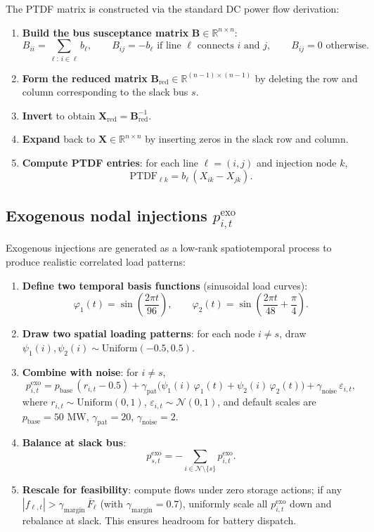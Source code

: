 \documentclass[11pt]{article}
\begin{document}
The PTDF matrix is constructed via the standard DC power flow derivation:
\begin{enumerate}
\item \textbf{Build the bus susceptance matrix} $\mathbf{B}\in\mathbb{R}^{n\times n}$:
\[
B_{ii} = \sum_{\ell:\,i\in\ell} b_\ell, \qquad B_{ij} = -b_\ell \text{ if line } \ell \text{ connects } i \text{ and } j, \qquad B_{ij}=0 \text{ otherwise}.
\]
\item \textbf{Form the reduced matrix} $\mathbf{B}_{\mathrm{red}}\in\mathbb{R}^{(n-1)\times(n-1)}$ by deleting the row and column corresponding to the slack bus $s$.
\item \textbf{Invert} to obtain $\mathbf{X}_{\mathrm{red}}=\mathbf{B}_{\mathrm{red}}^{-1}$.
\item \textbf{Expand} back to $\mathbf{X}\in\mathbb{R}^{n\times n}$ by inserting zeros in the slack row and column.
\item \textbf{Compute PTDF entries}: for each line $\ell=(i,j)$ and injection node $k$,
\[
\mathrm{PTDF}_{\ell k} = b_\ell\,(X_{ik} - X_{jk}).
\]
\end{enumerate}

\subsection{Exogenous nodal injections $p^{\mathrm{exo}}_{i,t}$}
Exogenous injections are generated as a low-rank spatiotemporal process to produce realistic correlated load patterns:
\begin{enumerate}
\item \textbf{Define two temporal basis functions} (sinusoidal load curves):
\[
\varphi_1(t) = \sin\!\left(\frac{2\pi t}{96}\right), \qquad \varphi_2(t) = \sin\!\left(\frac{2\pi t}{48} + \frac{\pi}{4}\right).
\]
\item \textbf{Draw two spatial loading patterns}: for each node $i\ne s$, draw $\psi_1(i),\psi_2(i)\sim\mathrm{Uniform}(-0.5,0.5)$.
\item \textbf{Combine with noise}: for $i\ne s$,
\[
p^{\mathrm{exo}}_{i,t} = p_{\mathrm{base}}\,(r_{i,t}-0.5) + \gamma_{\mathrm{pat}}\bigl(\psi_1(i)\,\varphi_1(t)+\psi_2(i)\,\varphi_2(t)\bigr) + \gamma_{\mathrm{noise}}\,\varepsilon_{i,t},
\]
where $r_{i,t}\sim\mathrm{Uniform}(0,1)$, $\varepsilon_{i,t}\sim\mathcal{N}(0,1)$, and default scales are $p_{\mathrm{base}}=50$ MW, $\gamma_{\mathrm{pat}}=20$, $\gamma_{\mathrm{noise}}=2$.
\item \textbf{Balance at slack bus}:
\[
p^{\mathrm{exo}}_{s,t} = -\sum_{i\in\mathcal{N}\setminus\{s\}} p^{\mathrm{exo}}_{i,t}.
\]
\item \textbf{Rescale for feasibility}: compute flows under zero storage actions; if any $|f_{\ell,t}|>\gamma_{\mathrm{margin}}\,\overline{F}_\ell$ (with $\gamma_{\mathrm{margin}}=0.7$), uniformly scale all $p^{\mathrm{exo}}_{i,t}$ down and rebalance at slack. This ensures headroom for battery dispatch.
\end{enumerate}
\end{document}
